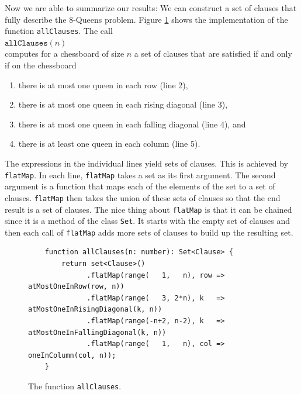 Now we are able to summarize our results: We can construct a set of clauses that fully describe the 8-Queens problem.
Figure \ref{fig:allClauses} shows the implementation of the function \texttt{allClauses}.
The call \\[0.2cm]
\hspace*{1.3cm} $\texttt{allClauses}(n)$ \\[0.2cm]
computes for a chessboard of size $n$ a set of clauses that
are satisfied if and only if on the chessboard
\begin{enumerate}
\item there is at most one queen in each row (line 2),
\item there is at most one queen in each rising diagonal (line 3),
\item there is at most one queen in each falling diagonal (line 4), and
\item there is at least one queen in each column (line 5).
\end{enumerate}
The expressions in the individual lines yield sets of clauses.  This is achieved by \texttt{flatMap}.
In each line, \texttt{flatMap} takes a set as its first argument.  The second argument is a function that maps
each of the elements of the set to a set of clauses.  \texttt{flatMap} then takes the union of these sets of
clauses so that the end result is a set of clauses.  The nice thing about \texttt{flatMap} is that it can be
chained since it is a method of the class \texttt{Set}.  It starts with the empty set of clauses and then each
call of \texttt{flatMap} adds more sets of clauses to build up the resulting set.

\begin{figure}[!ht]
  \centering
\begin{verbatim}
    function allClauses(n: number): Set<Clause> {
        return set<Clause>()
              .flatMap(range(   1,   n), row => atMostOneInRow(row, n))
              .flatMap(range(   3, 2*n), k   => atMostOneInRisingDiagonal(k, n))
              .flatMap(range(-n+2, n-2), k   => atMostOneInFallingDiagonal(k, n))
              .flatMap(range(   1,   n), col => oneInColumn(col, n));
    }                
\end{verbatim}
\vspace*{-0.3cm}
  \caption{The function \texttt{allClauses}.}
  \label{fig:allClauses}
\end{figure}

